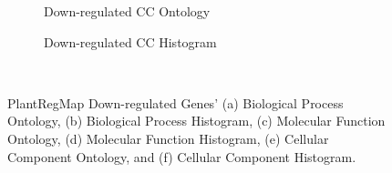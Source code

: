 \documentclass[12pt,letterpaper]{article}
\begin{document}
\begin{figure}[H]
\begin{subfigure}[b]{0.48\textwidth}
    \centering
    \caption{Down-regulated CC Ontology}
    \label{fig:enter-label}
\end{subfigure}
\begin{subfigure}[b]{0.48\textwidth}
    \centering
    \caption{Down-regulated CC Histogram}
    \label{fig:enter-label}
\end{subfigure}\
\caption{PlantRegMap Down-regulated Genes' (a) Biological Process Ontology, (b) Biological Process Histogram, (c) Molecular Function Ontology, (d) Molecular Function Histogram, (e) Cellular Component Ontology, and (f) Cellular Component Histogram.}
\end{figure}
\end{document}
